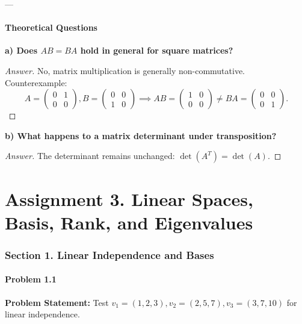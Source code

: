 \documentclass[11pt, a4paper]{article}
\begin{document}
---

\subsection*{Theoretical Questions}

\textbf{a) Does $AB = BA$ hold in general for square matrices?}
\begin{proof}[Answer]
No, matrix multiplication is generally non-commutative. Counterexample:
$$ A = \begin{pmatrix} 0 & 1 \\ 0 & 0 \end{pmatrix}, B = \begin{pmatrix} 0 & 0 \\ 1 & 0 \end{pmatrix} \implies AB = \begin{pmatrix} 1 & 0 \\ 0 & 0 \end{pmatrix} \ne BA = \begin{pmatrix} 0 & 0 \\ 0 & 1 \end{pmatrix}. $$
\end{proof}

\textbf{b) What happens to a matrix determinant under transposition?}
\begin{proof}[Answer]
The determinant remains unchanged: $\det(A^T) = \det(A)$.
\end{proof}

\newpage

\part{Assignment 3. Linear Spaces, Basis, Rank, and Eigenvalues}

\section{Section 1. Linear Independence and Bases}

\subsection*{Problem 1.1}
\textbf{Problem Statement:} Test $v_1 = (1, 2, 3), v_2 = (2, 5, 7), v_3 = (3, 7, 10)$ for linear independence.
\end{document}
